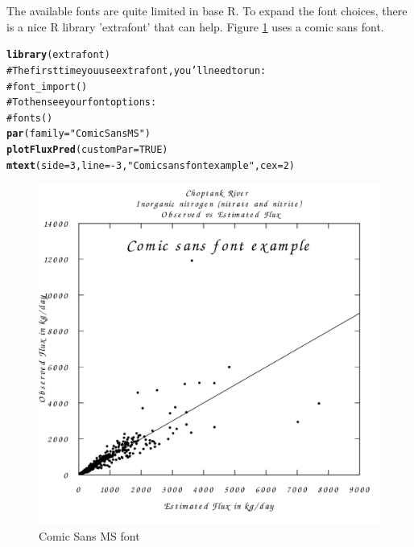 \documentclass[a4paper,11pt]{article}\usepackage{graphicx, color}
\makeatletter
\newcommand{\hlfunctioncall}[1]{\textcolor[rgb]{0.501960784313725,0,0.329411764705882}{\textbf{#1}}}%
\newcommand{\hlstring}[1]{\textcolor[rgb]{0.6,0.6,1}{#1}}%
\newcommand{\hlcomment}[1]{\textcolor[rgb]{0.180392156862745,0.6,0.341176470588235}{#1}}%
\newenvironment{kframe}{%
 \def\at@end@of@kframe{}%
 \ifinner\ifhmode%
  \def\at@end@of@kframe{\end{minipage}}%
  \begin{minipage}{\columnwidth}%
 \fi\fi%
 \def\FrameCommand##1{\hskip\@totalleftmargin \hskip-\fboxsep
 \colorbox{shadecolor}{##1}\hskip-\fboxsep
     \hskip-\linewidth \hskip-\@totalleftmargin \hskip\columnwidth}%
 \MakeFramed {\advance\hsize-\width
   \@totalleftmargin\z@ \linewidth\hsize
   \@setminipage}}%
 {\par\unskip\endMakeFramed%
 \at@end@of@kframe}
\newenvironment{knitrout}{}{} %
\makeatother
\begin{document}
The available fonts are quite limited in base R. To expand the font choices, there is a nice R library 'extrafont' that can help. Figure \ref{fig:harderFontChange} uses a comic sans font. 
\begin{knitrout}
\color{fgcolor}\begin{kframe}
\begin{alltt}
\hlfunctioncall{library}(extrafont)
\hlcomment{# The first time you use extrafont, you'll need to run: }
\hlcomment{# font_import()}
\hlcomment{# To then see your font options:}
\hlcomment{# fonts()}
\hlfunctioncall{par}(family=\hlstring{"Comic Sans MS"})
\hlfunctioncall{plotFluxPred}(customPar=TRUE)
\hlfunctioncall{mtext}(side=3,line=-3,\hlstring{"Comic sans font example"},cex=2)
\end{alltt}
\end{kframe}\begin{figure}[]

\includegraphics[width=1\linewidth,height=1\linewidth]{figure/harderFontChange} \caption[Comic Sans MS font]{Comic Sans MS font\label{fig:harderFontChange}}
\end{figure}


\end{knitrout}

\FloatBarrier
\end{document}
